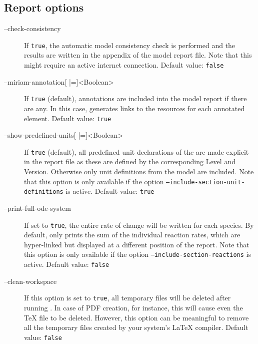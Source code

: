 \subsection{Report options}
\begin{description}
\item[--check-consistency]
  If \texttt{true}, the automatic model consistency check is performed and
  the results are written in the appendix of the model report file.
  Note that this might require an active internet connection.
  Default value: \texttt{false}

\item[--miriam-annotation{[} |={]}<Boolean>]
  If \texttt{true} (default), \MIRIAM annotations are included into the model
  report if there are any. In this case, \SBMLLaTeX generates
  links to the resources for each annotated element.
  Default value: \texttt{true}

\item[--show-predefined-units{[} |={]}<Boolean>]
  If \texttt{true} (default), all predefined unit declarations of the \SBML
  are made explicit in the report file as these are defined by
  the corresponding \SBML Level and Version. Otherwise only unit
  definitions from the model are included. Note that this option
  is only available if the option \texttt{--include-section-unit-definitions}
  is active.
  Default value: \texttt{true}

\item[--print-full-ode-system]
  If set to \texttt{true}, the entire rate of change will be written for
  each species. By default, \SBMLLaTeX only prints the sum of
  the individual reaction rates, which are hyper-linked but displayed
  at a different position of the report. Note that this option
  is only available if the option \texttt{--include-section-reactions}
  is active.
  Default value: \texttt{false}

\item[--clean-workspace]
  If this option is set to \texttt{true}, all temporary files will be deleted
  after running \SBMLLaTeX. In case of PDF creation, for instance,
  this will cause even the \TeX{} file to be deleted. However, this
  option can be meaningful to remove all the temporary files created
  by your system's \LaTeX{} compiler.
  Default value: \texttt{false}
\end{description}

